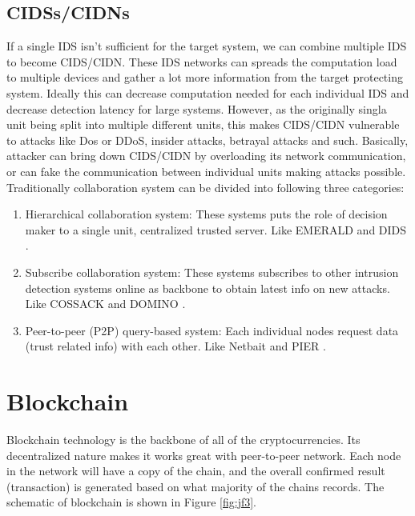 \documentclass[12pt]{report}
\begin{document}
\subsection{CIDSs/CIDNs}
If a single IDS isn't sufficient for the target system, we can combine multiple IDS to become CIDS/CIDN. These IDS networks can spreads the computation load to multiple devices and gather a lot more information from the target protecting system. Ideally this can decrease computation needed for each individual IDS and decrease detection latency for large systems. However, as the originally singla unit being split into multiple different units, this makes CIDS/CIDN vulnerable to attacks like Dos or DDoS, insider attacks, betrayal attacks and such. Basically, attacker can bring down CIDS/CIDN by overloading its network communication, or can fake the communication between individual units making attacks possible. \\

Traditionally collaboration system can be divided into following three categories:
\begin{enumerate}
	\item{Hierarchical collaboration system}: These systems puts the role of decision maker to a single unit, centralized trusted server. Like EMERALD \cite{emerald-niss97} and DIDS \cite{Snapp1997DIDSI}.
	\item{Subscribe collaboration system}: These systems subscribes to other intrusion detection systems online as backbone to obtain latest info on new attacks. Like COSSACK \cite{COSSACK} and DOMINO \cite{DOMINO}.
	\item{Peer-to-peer (P2P) query-based system}: Each individual nodes request data (trust related info) with each other. Like Netbait \cite{Netbait} and PIER \cite{PIER}.
\end{enumerate}

\section{Blockchain}

Blockchain technology is the backbone of all of the cryptocurrencies. Its decentralized nature makes it works great with peer-to-peer network. Each node in the network will have a copy of the chain, and the overall confirmed result (transaction) is generated based on what majority of the chains records. The schematic of blockchain is shown in Figure \ref{fig:jf3}. \\
\end{document}
